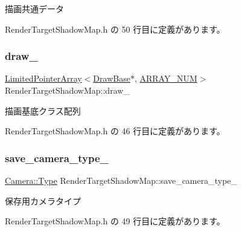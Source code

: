 描画共通データ 



 Render\+Target\+Shadow\+Map.\+h の 50 行目に定義があります。

\mbox{\label{class_render_target_shadow_map_a8c16acb949d466197d47c4d57484eb7e}} 
\subsubsection{\texorpdfstring{draw\+\_\+}{draw\_}}
{\footnotesize\ttfamily \mbox{\hyperlink{class_limited_pointer_array}{Limited\+Pointer\+Array}}$<$\mbox{\hyperlink{class_draw_base}{Draw\+Base}}$\ast$, \mbox{\hyperlink{class_render_target_shadow_map_a25b5fd61eef50d76b69314102ccc51fe}{A\+R\+R\+A\+Y\+\_\+\+N\+UM}}$>$ Render\+Target\+Shadow\+Map\+::draw\+\_\+\hspace{0.3cm}{\ttfamily [private]}}



描画基底クラス配列 



 Render\+Target\+Shadow\+Map.\+h の 46 行目に定義があります。

\mbox{\label{class_render_target_shadow_map_a57f64742fbf9926ef3ab06eca311c9e7}} 
\subsubsection{\texorpdfstring{save\+\_\+camera\+\_\+type\+\_\+}{save\_camera\_type\_}}
{\footnotesize\ttfamily \mbox{\hyperlink{class_camera_a3b0a1f58deca679ac665f61c480d1dcb}{Camera\+::\+Type}} Render\+Target\+Shadow\+Map\+::save\+\_\+camera\+\_\+type\+\_\+\hspace{0.3cm}{\ttfamily [private]}}



保存用カメラタイプ 



 Render\+Target\+Shadow\+Map.\+h の 49 行目に定義があります。

